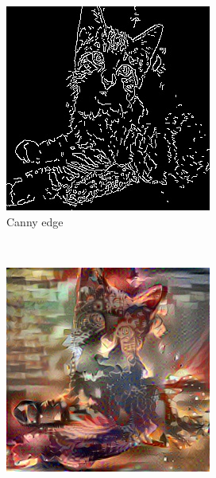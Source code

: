 \documentclass[10pt,twocolumn,letterpaper]{article}
\begin{document}
\begin{figure}
  \centering
  \begin{subfigure}[b]{0.18\textwidth}
    \includegraphics[width=\textwidth]{figure/baseline2/canny.jpg}
    \caption{Canny edge}
    \label{fig::base11}
  \end{subfigure}
  ~
  \begin{subfigure}[b]{0.18\textwidth}
    \includegraphics[width=\textwidth]{figure/baseline2/yys.jpg}

\end{subfigure}
\end{figure}
\end{document}
